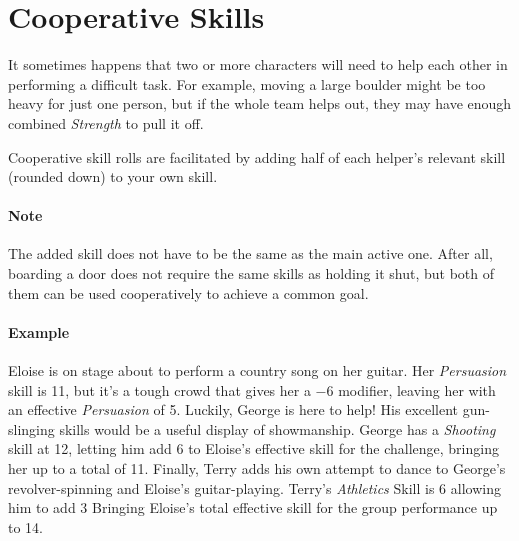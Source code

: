 \section{Cooperative Skills}
It sometimes happens that two or more characters will need to help each other in performing a difficult task.
For example, moving a large boulder might be too heavy for just one person, but if the whole team helps out, they may have enough combined \textit{Strength} to pull it off.

Cooperative skill rolls are facilitated by adding half of each helper's relevant skill (rounded down) to your own skill.

\paragraph{Note} The added skill does not have to be the same as the main active one. 
After all, boarding a door does not require the same skills as holding it shut, but both of them can be used cooperatively to achieve a common goal.

\paragraph{Example}
Eloise is on stage about to perform a country song on her guitar.
Her \textit{Persuasion} skill is 11, but it's a tough crowd that gives her a $-6$ modifier, leaving her with an effective \textit{Persuasion} of 5.
Luckily, George is here to help!
His excellent gun-slinging skills would be a useful display of showmanship.
George has a \textit{Shooting} skill at 12, letting him add 6 to Eloise's effective skill for the challenge, bringing her up to a total of 11.
Finally, Terry adds his own attempt to dance to George's revolver-spinning and Eloise's guitar-playing. 
Terry's \textit{Athletics} Skill is 6 allowing him to add 3 Bringing Eloise's total effective skill for the group performance up to 14.